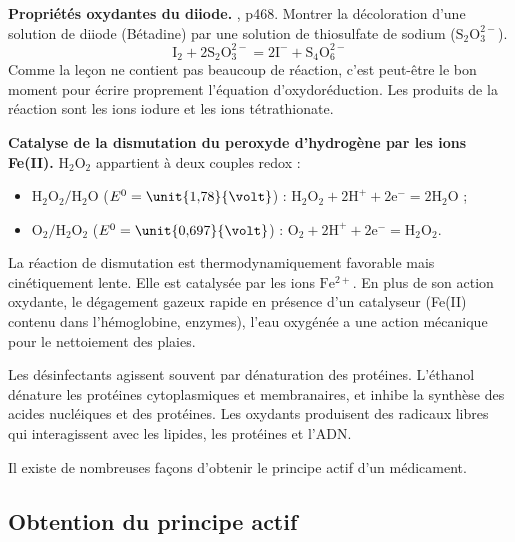 \begin{experience}
\textbf{Propriétés oxydantes du diiode.}
\cite{Dulaurans2012}, p468.
Montrer la décoloration d'une solution de diiode (Bétadine) par une solution de thiosulfate de sodium ($\mathrm{S_2O_3^{2-}}$).
\begin{equation}
\mathrm{I_2 + 2S_2O_3^{2-} = 2I^- + S_4O_6^{2-}}
\end{equation}
Comme la leçon ne contient pas beaucoup de réaction, c'est peut-être le bon moment pour écrire proprement l'équation d'oxydoréduction.
Les produits de la réaction sont les ions iodure et les ions tétrathionate. 
\end{experience}

\begin{experience}
\textbf{Catalyse de la dismutation du peroxyde d'hydrogène par les ions Fe(II).}
$\mathrm{H_2O_2}$ appartient à deux couples redox :
\begin{itemize}
\item $\mathrm{H_2O_2/H_2O}$ ($E^0 = \unit{1{,}78}{\volt}$) : $\mathrm{H_2O_2 + 2H^+ + 2e^- = 2H_2O}$ ;
\item $\mathrm{O_2/H_2O_2}$ ($E^0 = \unit{0{,}697}{\volt}$) : $\mathrm{O_2 + 2H^+ + 2e^- = H_2O_2}$.
\end{itemize}
La réaction de dismutation est thermodynamiquement favorable mais cinétiquement lente.
Elle est catalysée par les ions $\mathrm{Fe^{2+}}$.
En plus de son action oxydante, le dégagement gazeux rapide en présence d'un catalyseur (Fe(II) contenu dans l'hémoglobine, enzymes), l'eau oxygénée a une action mécanique pour le nettoiement des plaies.
\end{experience}

\begin{remarque}
Les désinfectants agissent souvent par dénaturation des protéines.
L'éthanol dénature les protéines cytoplasmiques et membranaires, et inhibe la synthèse  des acides nucléiques et des protéines.
Les oxydants produisent des radicaux libres qui interagissent avec les lipides, les protéines et l'ADN.
\end{remarque}

\begin{transition}
Il existe de nombreuses façons d'obtenir le principe actif d'un médicament.
\end{transition}

\subsection{Obtention du principe actif}

